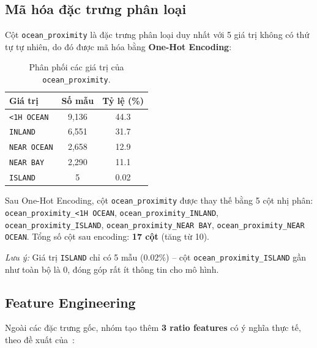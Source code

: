 \documentclass[12pt,a4paper]{article}
\begin{document}
\subsection{Mã hóa đặc trưng phân loại}

Cột \texttt{ocean\_proximity} là đặc trưng phân loại duy nhất với
5 giá trị không có thứ tự tự nhiên, do đó được mã hóa bằng
\textbf{One-Hot Encoding}:

\begin{table}[H]
  \centering
  \caption{Phân phối các giá trị của \texttt{ocean\_proximity}.}
  \label{tab:ocean_proximity}
  \begin{tabular}{lcc}
    \toprule
    \textbf{Giá trị} & \textbf{Số mẫu} & \textbf{Tỷ lệ (\%)} \\
    \midrule
    \texttt{<1H OCEAN}  & 9{,}136 & 44.3 \\
    \texttt{INLAND}     & 6{,}551 & 31.7 \\
    \texttt{NEAR OCEAN} & 2{,}658 & 12.9 \\
    \texttt{NEAR BAY}   & 2{,}290 & 11.1 \\
    \texttt{ISLAND}     & 5       & 0.02 \\
    \bottomrule
  \end{tabular}
\end{table}

Sau One-Hot Encoding, cột \texttt{ocean\_proximity} được thay thế bằng
5 cột nhị phân: \texttt{ocean\_proximity\_<1H OCEAN},
\texttt{ocean\_proximity\_INLAND}, \texttt{ocean\_proximity\_ISLAND},
\texttt{ocean\_proximity\_NEAR BAY}, \texttt{ocean\_proximity\_NEAR OCEAN}.
Tổng số cột sau encoding: \textbf{17 cột} (tăng từ 10).

\textit{Lưu ý:} Giá trị \texttt{ISLAND} chỉ có 5 mẫu ($0.02\%$) --
cột \texttt{ocean\_proximity\_ISLAND} gần như toàn bộ là 0, đóng góp
rất ít thông tin cho mô hình.

\subsection{Feature Engineering}

Ngoài các đặc trưng gốc, nhóm tạo thêm \textbf{3 ratio features}
có ý nghĩa thực tế, theo đề xuất của~\cite{geron2019}:
\end{document}
